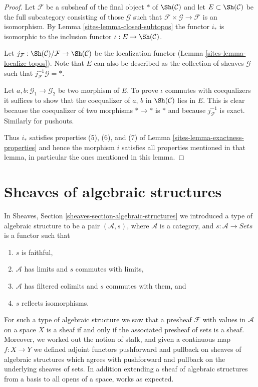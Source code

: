 \begin{proof}

Let $\mathcal{F}$ be a subsheaf of the final object $*$ of $\Sh(\mathcal{C})$
and let $E \subset \Sh(\mathcal{C})$ be the full subcategory consisting
of those $\mathcal{G}$ such that
$\mathcal{F} \times \mathcal{G} \to \mathcal{F}$ is an isomorphism.
By Lemma \ref{sites-lemma-closed-subtopos}
the functor $i_*$ is isomorphic to the
inclusion functor $\iota : E \to \Sh(\mathcal{C})$.

\medskip\noindent
Let $j_{\mathcal{F}} : \Sh(\mathcal{C})/\mathcal{F} \to \Sh(\mathcal{C})$
be the localization functor (Lemma \ref{sites-lemma-localize-topos}).
Note that $E$ can also be described as
the collection of sheaves $\mathcal{G}$ such that
$j_\mathcal{F}^{-1}\mathcal{G} = *$.

\medskip\noindent
Let $a, b : \mathcal{G}_1 \to \mathcal{G}_2$ be two morphism of $E$.
To prove $\iota$ commutes with coequalizers it suffices to show that
the coequalizer of $a$, $b$ in $\Sh(\mathcal{C})$ lies in $E$.
This is clear because
the coequalizer of two morphisms $* \to *$ is $*$ and because
$j_\mathcal{F}^{-1}$ is exact. Similarly for pushouts.

\medskip\noindent
Thus $i_*$ satisfies properties (5), (6), and (7) of
Lemma \ref{sites-lemma-exactness-properties} and hence
the morphism $i$ satisfies all properties mentioned in that
lemma, in particular the ones mentioned in this lemma.
\end{proof}

\section{Sheaves of algebraic structures}
\label{sites-section-sheaves-algebraic-structures}
In Sheaves, Section \ref{sheaves-section-algebraic-structures}
we introduced a type of algebraic structure to be a pair
$(\mathcal{A}, s)$, where $\mathcal{A}$ is a category,
and $s : \mathcal{A} \to \textit{Sets}$ is a functor such
that
\begin{enumerate}
\item $s$ is faithful,
\item $\mathcal{A}$ has limits and $s$ commutes with limits,
\item $\mathcal{A}$ has filtered colimits and $s$ commutes with them, and
\item $s$ reflects isomorphisms.
\end{enumerate}
For such a type of algebraic structure we saw that a presheaf
$\mathcal{F}$ with values in $\mathcal{A}$ on a space $X$ is a sheaf if and
only if the associated presheaf of sets is a sheaf. Moreover,
we worked out the notion of stalk, and given a continuous map
$f : X \to Y$ we defined adjoint functors pushforward and pullback
on sheaves of algebraic structures which agrees with pushforward
and pullback on the underlying sheaves of sets. In addition extending
a sheaf of algebraic structures from a basis to all opens
of a space, works as expected.

